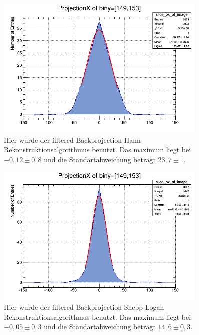 \begin{figure}[h!]
	\centering
	\includegraphics[width=0.9\textwidth]{Hann-Filter.png}
	\caption{Hier wurde der filtered Backprojection Hann Rekonstruktionsalgorithmus benutzt. Das maximum liegt bei $-0,12 \pm 0,8$ und die Standartabweichung beträgt $23,7 \pm 1$.}
	\label{ooh}
\end{figure}
\begin{figure}[h!]
	\centering
	\includegraphics[width=0.9\textwidth]{Shepp-Logan-Filter.png}
	\caption{Hier wurde der filtered Backprojection Shepp-Logan  Rekonstruktionsalgorithmus benutzt. Das maximum liegt bei $-0,05 \pm 0,3$ und die Standartabweichung beträgt $14,6 \pm 0,3$.}
	\label{oos}
\end{figure}
